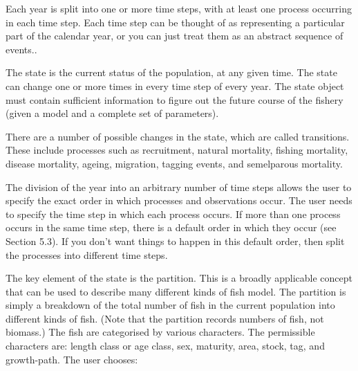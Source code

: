 Each year is split into one or more time steps, with at least one process occurring in each time step. Each time step can be thought of as representing a particular part of the calendar year, or you can just treat them as an abstract sequence of events..

The state is the current status of the population, at any given time. The state can change one or more times in every time step of every year. The state object must contain sufficient information to figure out the future course of the fishery (given a model and a complete set of parameters).

There are a number of possible changes in the state, which are called transitions. These include processes such as recruitment, natural mortality, fishing mortality, disease mortality, ageing, migration, tagging events, and semelparous mortality.

The division of the year into an arbitrary number of time steps allows the user to specify the exact order in which processes and observations occur. The user needs to specify the time step in which each process occurs. If more than one process occurs in the same time step, there is a default order in which they occur (see Section 5.3). If you don’t want things to happen in this default order, then split the processes into different time steps.


The key element of the state is the partition. This is a broadly applicable concept that can be used to describe many different kinds of fish model. The partition is simply a breakdown of the total number of fish in the current population into different kinds of fish. (Note that the partition records numbers of fish, not biomass.) The fish are categorised by various characters. The permissible characters are: length class or age class, sex, maturity, area, stock, tag, and growth-path. The user chooses:

